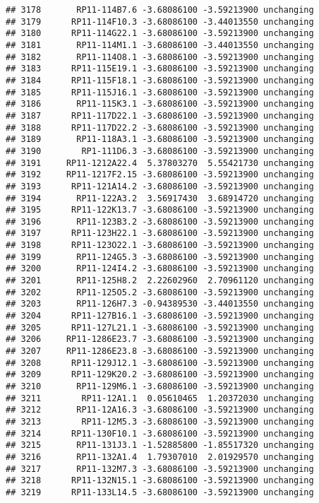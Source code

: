 \documentclass[]{article}
\begin{document}
\begin{verbatim}
## 3178       RP11-114B7.6 -3.68086100 -3.59213900 unchanging
## 3179      RP11-114F10.3 -3.68086100 -3.44013550 unchanging
## 3180      RP11-114G22.1 -3.68086100 -3.59213900 unchanging
## 3181       RP11-114M1.1 -3.68086100 -3.44013550 unchanging
## 3182       RP11-114O8.1 -3.68086100 -3.59213900 unchanging
## 3183      RP11-115E19.1 -3.68086100 -3.59213900 unchanging
## 3184      RP11-115F18.1 -3.68086100 -3.59213900 unchanging
## 3185      RP11-115J16.1 -3.68086100 -3.59213900 unchanging
## 3186       RP11-115K3.1 -3.68086100 -3.59213900 unchanging
## 3187      RP11-117D22.1 -3.68086100 -3.59213900 unchanging
## 3188      RP11-117D22.2 -3.68086100 -3.59213900 unchanging
## 3189       RP11-118A3.1 -3.68086100 -3.59213900 unchanging
## 3190        RP1-111D6.3 -3.68086100 -3.59213900 unchanging
## 3191     RP11-1212A22.4  5.37803270  5.55421730 unchanging
## 3192     RP11-1217F2.15 -3.68086100 -3.59213900 unchanging
## 3193      RP11-121A14.2 -3.68086100 -3.59213900 unchanging
## 3194       RP11-122A3.2  3.56917430  3.68914720 unchanging
## 3195      RP11-122K13.7 -3.68086100 -3.59213900 unchanging
## 3196       RP11-123B3.2 -3.68086100 -3.59213900 unchanging
## 3197      RP11-123H22.1 -3.68086100 -3.59213900 unchanging
## 3198      RP11-123O22.1 -3.68086100 -3.59213900 unchanging
## 3199       RP11-124G5.3 -3.68086100 -3.59213900 unchanging
## 3200       RP11-124I4.2 -3.68086100 -3.59213900 unchanging
## 3201       RP11-125H8.2  2.22602960  2.70961120 unchanging
## 3202       RP11-125O5.2 -3.68086100 -3.59213900 unchanging
## 3203       RP11-126H7.3 -0.94389530 -3.44013550 unchanging
## 3204      RP11-127B16.1 -3.68086100 -3.59213900 unchanging
## 3205      RP11-127L21.1 -3.68086100 -3.59213900 unchanging
## 3206     RP11-1286E23.7 -3.68086100 -3.59213900 unchanging
## 3207     RP11-1286E23.8 -3.68086100 -3.59213900 unchanging
## 3208      RP11-129J12.1 -3.68086100 -3.59213900 unchanging
## 3209      RP11-129K20.2 -3.68086100 -3.59213900 unchanging
## 3210       RP11-129M6.1 -3.68086100 -3.59213900 unchanging
## 3211        RP11-12A1.1  0.05610465  1.20372030 unchanging
## 3212       RP11-12A16.3 -3.68086100 -3.59213900 unchanging
## 3213        RP11-12M5.3 -3.68086100 -3.59213900 unchanging
## 3214      RP11-130F10.1 -3.68086100 -3.59213900 unchanging
## 3215       RP11-131J3.1 -1.52885800 -1.85517320 unchanging
## 3216       RP11-132A1.4  1.79307010  2.01929570 unchanging
## 3217       RP11-132M7.3 -3.68086100 -3.59213900 unchanging
## 3218      RP11-132N15.1 -3.68086100 -3.59213900 unchanging
## 3219      RP11-133L14.5 -3.68086100 -3.59213900 unchanging

\end{verbatim}
\end{document}
